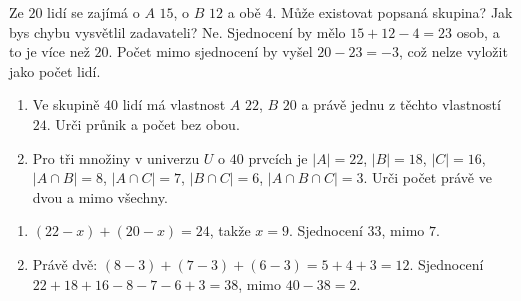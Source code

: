 \documentclass[11pt,a4paper]{article}
\begin{document}
\begin{zadaniReseniBox}[title={Rozšíření 1},breakable=false]
Ze $20$ lidí se zajímá o $A$ $15$, o $B$ $12$ a obě $4$.
Může existovat popsaná skupina? Jak bys chybu vysvětlil zadavateli?
\tcblower
Ne. Sjednocení by mělo $15+12-4=23$ osob, a to je více než $20$.
Počet mimo sjednocení by vyšel $20-23=-3$, což nelze vyložit jako počet lidí.
\end{zadaniReseniBox}

\begin{zadaniReseniBox}[title={Domácí úkol}]
\begin{enumerate}[label=\alph*)]
\item Ve skupině $40$ lidí má vlastnost $A$ $22$, $B$ $20$ a právě jednu
z těchto vlastností $24$. Urči průnik a počet bez obou.
\item Pro tři množiny v univerzu $U$ o $40$ prvcích je
$|A|=22$, $|B|=18$, $|C|=16$, $|A\cap B|=8$,
$|A\cap C|=7$, $|B\cap C|=6$, $|A\cap B\cap C|=3$.
Urči počet právě ve dvou a mimo všechny.
\end{enumerate}
\tcblower
\begin{enumerate}[label=\alph*)]
\item $(22-x)+(20-x)=24$, takže $x=9$. Sjednocení $33$, mimo $7$.
\item Právě dvě: $(8-3)+(7-3)+(6-3)=5+4+3=12$.
Sjednocení $22+18+16-8-7-6+3=38$, mimo $40-38=2$.
\end{enumerate}
\end{zadaniReseniBox}
\end{document}
